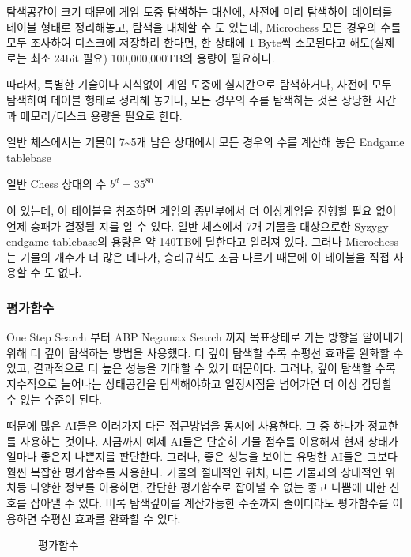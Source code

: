 \documentclass[letterpaper,10pt,english]{sphinxmanual}
\begin{document}
탐색공간이 크기 때문에 게임 도중 탐색하는 대신에, 사전에 미리 탐색하여 데이터를 테이블 형태로 정리해놓고,
탐색을 대체할 수 도 있는데, Microchess 모든 경우의 수를 모두 조사하여 디스크에 저장하려 한다면,
한 상태에 1 Byte씩 소모된다고 해도(실제로는 최소 24bit 필요) 100,000,000TB의 용량이 필요하다.

따라서, 특별한 기술이나 지식없이 게임 도중에 실시간으로 탐색하거나,
사전에 모두 탐색하여 테이블 형태로 정리해 놓거나, 모든 경우의 수를 탐색하는 것은
상당한 시간과 메모리/디스크 용량을 필요로 한다.

일반 체스에서는 기물이 7\textasciitilde{}5개 남은 상태에서 모든 경우의 수를 계산해 놓은 Endgame tablebase %
\begin{footnote}[7]\sphinxAtStartFootnote
일반 Chess 상태의 수 \(b^d = 35^{80}\)
%
\end{footnote} 이 있는데,
이 테이블을 참조하면 게임의 종반부에서 더 이상게임을 진행할 필요 없이 언제 승패가 결정될 지를 알 수 있다.
일반 체스에서 7개 기물을 대상으로한 Syzygy endgame tablebase의 용량은 약 140TB에 달한다고 알려져 있다.
그러나 Microchess는 기물의 개수가 더 많은 데다가, 승리규칙도 조금 다르기 때문에 이 테이블을 직접 사용할 수 도 없다.


\subsubsection{평가함수}
\label{\detokenize{03-basic_ai_examples:id12}}
One Step Search 부터 ABP Negamax Search 까지 목표상태로 가는 방향을 알아내기 위해 더 깊이 탐색하는 방법을 사용했다.
더 깊이 탐색할 수록 수평선 효과를 완화할 수 있고, 결과적으로 더 높은 성능을 기대할 수 있기 때문이다.
그러나, 깊이 탐색할 수록 지수적으로 늘어나는 상태공간을 탐색해야하고 일정시점을 넘어가면 더 이상 감당할 수 없는 수준이 된다.

때문에 많은 AI들은 여러가지 다른 접근방법을 동시에 사용한다. 그 중 하나가 정교한 {\hyperref[\detokenize{03-basic_ai_examples:eval-func-fig}]{}} 를 사용하는 것이다.
지금까지 예제 AI들은 단순히 기물 점수를 이용해서 현재 상태가 얼마나 좋은지 나쁜지를 판단한다.
그러나, 좋은 성능을 보이는 유명한 AI들은 그보다 훨씬 복잡한 평가함수를 사용한다.
기물의 절대적인 위치, 다른 기물과의 상대적인 위치등 다양한 정보를 이용하면, 간단한 평가함수로 잡아낼 수 없는
좋고 나쁨에 대한 신호를 잡아낼 수 있다. 비록 탐색깊이를 계산가능한 수준까지 줄이더라도 평가함수를 이용하면 수평선 효과를 완화할 수 있다.

\begin{figure}[htbp]
\centering
\capstart

\noindent{}
\caption{평가함수}\label{\detokenize{03-basic_ai_examples:eval-func-fig}}\label{\detokenize{03-basic_ai_examples:id38}}\end{figure}
\end{document}
